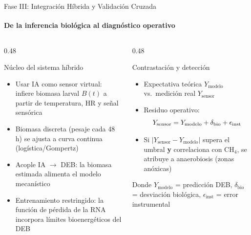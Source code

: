 \documentclass[aspectratio=169, 11pt]{beamer}
\begin{document}
\begin{frame}{Fase III: Integración Híbrida y Validación Cruzada}
\framesubtitle{De la inferencia biológica al diagnóstico operativo}

\begin{columns}[T,onlytextwidth]

\begin{column}{0.48\textwidth}

\begin{block}{Núcleo del sistema híbrido}
\scriptsize
\begin{itemize}
    \item Usar IA como sensor virtual: infiere biomasa larval $B(t)$ a partir de temperatura, HR y señal sensórica
    \item Biomasa discreta (pesaje cada 48 h) se ajusta a curva continua (logística/Gompertz)
    \item Acople IA $\rightarrow$ DEB: la biomasa estimada alimenta el modelo mecanístico
    \item Entrenamiento restringido: la función de pérdida de la RNA incorpora límites bioenergéticos del DEB
\end{itemize}
\end{block}

\end{column}

\begin{column}{0.48\textwidth}

\begin{block}{Contrastación y detección}
\scriptsize
\begin{itemize}
    \item Expectativa teórica $Y_{\text{modelo}}$ vs.\ medición real $Y_{\text{sensor}}$
    \item Residuo operativo:
    \begin{equation*}
        \scriptsize
        Y_{\text{sensor}} = Y_{\text{modelo}} + \delta_{\text{bio}} + \epsilon_{\text{inst}}
    \end{equation*}
    \item Si $|Y_{\text{sensor}} - Y_{\text{modelo}}|$ supera el umbral \textbf{y} correlaciona con CH$_4$, se atribuye a anaerobiosis (zonas anóxicas)
\end{itemize}
\tiny
Donde \quad $Y_{\text{modelo}}$ = predicción DEB, \; $\delta_{\text{bio}}$ = desviación biológica, \; $\epsilon_{\text{inst}}$ = error instrumental

\end{block}


\end{column}
\end{columns}
\end{frame}
\end{document}
